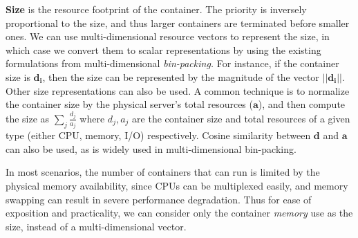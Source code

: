 \noindent \textbf{Size} is the resource footprint of the container. 
%
%
The priority is inversely proportional to the size, and thus larger containers are terminated before smaller ones. 
%
We can use multi-dimensional resource vectors to represent the size, in which case we convert them to scalar representations by using the existing formulations from multi-dimensional \emph{bin-packing.}
%
For instance, if the container size is $\mathbf{d_i}$, then the size can be represented by the magnitude of the vector $||\mathbf{d_i}||$.
%
Other size representations can also be used.
A common technique is to normalize the container size by the physical server's total resources ($\mathbf{a}$), and then compute the size as $\sum_j \frac{d_j}{a_j}$ where $d_j, a_j$ are the container size and total resources of a given type (either CPU, memory, I/O) respectively.
%
Cosine similarity between $\mathbf{d}$ and $\mathbf{a}$ can also be used, as is widely used in multi-dimensional bin-packing. 

In most scenarios, the number of containers that can run is limited by the physical memory availability, since CPUs can be multiplexed easily, and memory swapping can result in severe performance degradation.
Thus for ease of exposition and practicality, we can consider only the container \emph{memory} use as the size, instead of a multi-dimensional vector. 



%


%







